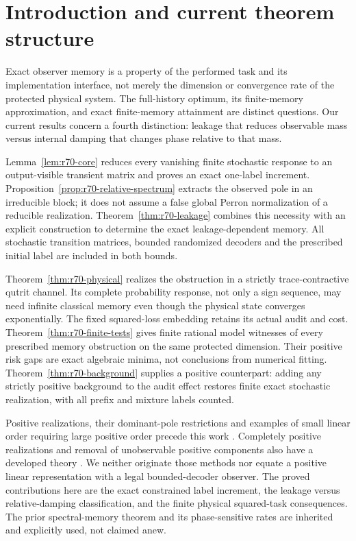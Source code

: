 \section{Introduction and current theorem structure}\label{sec:current-overview}\label{sec:introduction}
Exact observer memory is a property of the performed task and its implementation interface, not merely the dimension or convergence rate of the protected physical system. The full-history optimum, its finite-memory approximation, and exact finite-memory attainment are distinct questions. Our current results concern a fourth distinction: leakage that reduces observable mass versus internal damping that changes phase relative to that mass.

Lemma~\ref{lem:r70-core} reduces every vanishing finite stochastic response to an output-visible transient matrix and proves an exact one-label increment. Proposition~\ref{prop:r70-relative-spectrum} extracts the observed pole in an irreducible block; it does not assume a false global Perron normalization of a reducible realization. Theorem~\ref{thm:r70-leakage} combines this necessity with an explicit construction to determine the exact leakage-dependent memory. All stochastic transition matrices, bounded randomized decoders and the prescribed initial label are included in both bounds.

Theorem~\ref{thm:r70-physical} realizes the obstruction in a strictly trace-contractive qutrit channel. Its complete probability response, not only a sign sequence, may need infinite classical memory even though the physical state converges exponentially. The fixed squared-loss embedding retains its actual audit and cost. Theorem~\ref{thm:r70-finite-tests} gives finite rational model witnesses of every prescribed memory obstruction on the same protected dimension. Their positive risk gaps are exact algebraic minima, not conclusions from numerical fitting. Theorem~\ref{thm:r70-background} supplies a positive counterpart: adding any strictly positive background to the audit effect restores finite exact stochastic realization, with all prefix and mixture labels counted.

Positive realizations, their dominant-pole restrictions and examples of small linear order requiring large positive order precede this work \cite{BenvenutiFarina04,BenvenutiFarina99,OCinneide90,Maier91}. Completely positive realizations and removal of unobservable positive components also have a developed theory \cite{MonrasWinter14}. We neither originate those methods nor equate a positive linear representation with a legal bounded-decoder observer. The proved contributions here are the exact constrained label increment, the leakage versus relative-damping classification, and the finite physical squared-task consequences. The prior spectral-memory theorem and its phase-sensitive rates are inherited and explicitly used, not claimed anew.

